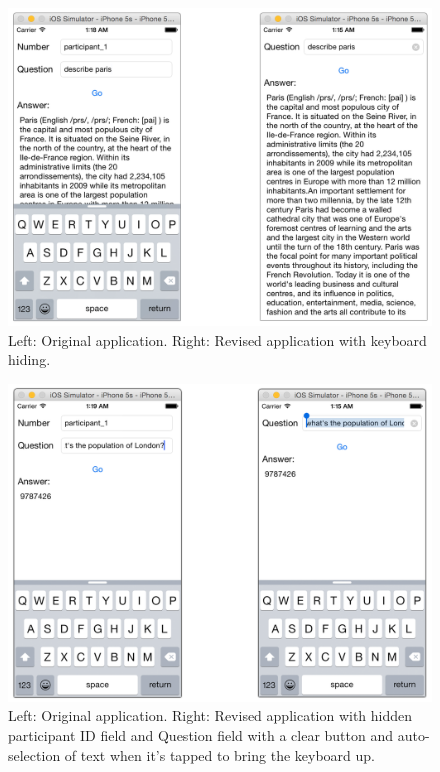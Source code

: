 \documentclass[authoryearcitations]{UoYCSproject}
\begin{document}
\begin{figure}[htb]
    \centering
    \includegraphics[width=\linewidth]{describe_paris}
    \caption{Left: Original application. Right: Revised application with keyboard hiding.}
    \label{fig:experimentClientParis}
\end{figure}

\begin{figure}[htb]
    \centering
    \includegraphics[width=\linewidth]{population}
    \caption{Left: Original application. Right: Revised application with hidden participant ID field and Question field with a clear button and auto-selection of text when it's tapped to bring the keyboard up.}
    \label{fig:experimentClientPopulation}
\end{figure}
\end{document}
